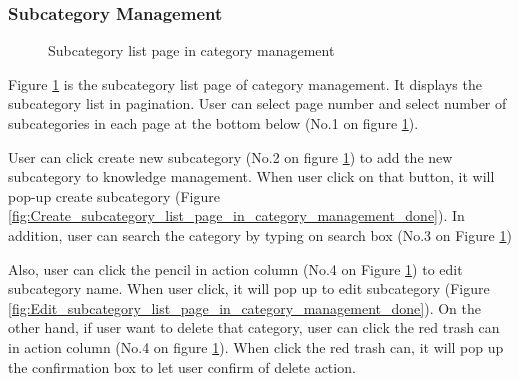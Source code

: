 \documentclass[12pt,oneside,openright,a4paper]{cpe-english-project}
\begin{document}
		\subsubsection{Subcategory Management}
		\begin{figure}[!h]\centering
			\caption{Subcategory list page in category management}\label{fig:Subcategory_list_page_in_category_management_done}
		\end{figure}
		\begin{flushleft}
			Figure \ref*{fig:Subcategory_list_page_in_category_management_done} is the subcategory list page of category management. It displays the subcategory list in pagination. User can select page number and select number of subcategories in each page at the bottom below (No.1 on figure \ref*{fig:Subcategory_list_page_in_category_management_done}).
		\end{flushleft}
		\begin{flushleft}
			User can click create new subcategory (No.2 on figure \ref*{fig:Subcategory_list_page_in_category_management_done}) to add the new subcategory to knowledge management. When user click on that button, it will pop-up create subcategory (Figure \ref*{fig:Create_subcategory_list_page_in_category_management_done}). In addition, user can search the category by typing on search box (No.3 on Figure \ref*{fig:Subcategory_list_page_in_category_management_done})
		\end{flushleft}
		\begin{flushleft}
			Also, user can click the pencil in action column (No.4 on Figure \ref*{fig:Subcategory_list_page_in_category_management_done}) to edit subcategory name. When user click, it will pop up to edit subcategory (Figure \ref*{fig:Edit_subcategory_list_page_in_category_management_done}). On the other hand, if user want to delete that category, user can click the red trash can in action column (No.4 on figure \ref*{fig:Subcategory_list_page_in_category_management_done}). When click the red trash can, it will pop up the confirmation box to let user confirm of delete action.
		\end{flushleft}
\end{document}
